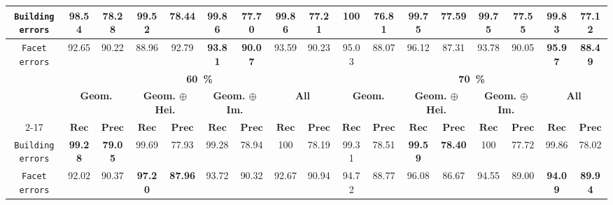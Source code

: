 \begin{sidewaystable}[htbp]
\begin{tabular}{| c | c c | c c | c c | c c || c c | c c | c c | c c |}
                \hline
                \texttt{Building errors} & 98.54 & 78.28 & \textbf{99.52} & \textbf{78.44} & 99.86 & 77.70 & 99.86 & 77.21 & 100 & 76.81 & \textbf{99.75} & \textbf{77.59} & 99.75 & 77.55 & 99.83 & 77.12 \\
                \hline
                \texttt{Facet errors} & 92.65 & 90.22 & 88.96 & 92.79 & \textbf{93.81} & \textbf{90.07} & 93.59 & 90.23 & 95.03 & 88.07 & 96.12 & 87.31 & 93.78 & 90.05 & \textbf{95.97} & \textbf{88.49} \\
                \hline
                \hline
                & \multicolumn{8}{c||}{\textbf{\SI{60}{\percent}}} & \multicolumn{8}{c|}{\textbf{\SI{70}{\percent}}}\\
                \hline
                &\multicolumn{2}{c|}{\textbf{Geom.}} & \multicolumn{2}{c|}{\textbf{Geom. \(\oplus\) Hei.}} & \multicolumn{2}{c|}{\textbf{Geom. \(\oplus\) Im.}} & \multicolumn{2}{c||}{\textbf{All}} & \multicolumn{2}{c|}{\textbf{Geom.}} & \multicolumn{2}{c|}{\textbf{Geom. \(\oplus\) Hei.}} & \multicolumn{2}{c|}{\textbf{Geom. \(\oplus\) Im.}} & \multicolumn{2}{x{1.5cm}|}{\textbf{All}}\\
                \cline{2-17}
                & \(\bm{Rec}\) & \(\bm{Prec}\) &  \(\bm{Rec}\) & \(\bm{Prec}\) &  \(\bm{Rec}\) & \(\bm{Prec}\) &  \(\bm{Rec}\) & \(\bm{Prec}\) & \(\bm{Rec}\) & \(\bm{Prec}\) &  \(\bm{Rec}\) & \(\bm{Prec}\) &  \(\bm{Rec}\) & \(\bm{Prec}\) &  \(\bm{Rec}\) & \(\bm{Prec}\) \\
                \hline
                \texttt{Building errors} & \textbf{99.28} & \textbf{79.05} & 99.69 & 77.93 & 99.28 & 78.94 & 100 & 78.19 & 99.31 & 78.51 & \textbf{99.59} & \textbf{78.40} & 100 & 77.72 & 99.86 & 78.02 \\
                \hline
                \texttt{Facet errors} & 92.02 & 90.37 & \textbf{97.20} & \textbf{87.96} & 93.72 & 90.32 & 92.67 & 90.94 & 94.72 & 88.77 & 96.08 & 86.67 & 94.55 & 89.00 & \textbf{94.09} & \textbf{89.94} \\
                \hline
            \end{tabular}
            \caption{\label{tab::representativeness_f2} Representativeness study on \textbf{\gls{acr::efin}} level 2.}
        \end{sidewaystable}
